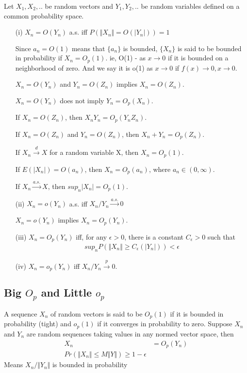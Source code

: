 \begin{definition}
Let $X_1, X_2,..$ be random vectors and $Y_1, Y_2,..$ be random variables defined on a common probability space.

\begin{itemize}
\item[(i)] $X_n = O(Y_n)$ a.s. iff $P(\Vert  X_n\Vert = O(|Y_n|)) = 1$

Since $a_n = O(1)$ means that $\{ a_n \}$ is bounded, $\{ X_n\}$ is said to be bounded in probability if $X_n = O_p(1)$. 
ie, O(1) - as $x \rightarrow 0$ if it is bounded on a neighborhood of zero. And we say it is o(1) as $x \rightarrow 0$ if $f(x) \rightarrow 0, x \rightarrow 0$.

$X_n = O(Y_n)$ and $Y_n = O(Z_n)$ implies $X_n = O(Z_n)$.

$X_n = O(Y_n)$ does not imply $Y_n = O_p(X_n)$.

If $X_n = O(Z_n)$, then $X_nY_n = O_p(Y_n Z_n)$.

If $X_n = O(Z_n)$ and $Y_n = O(Z_n)$, then $X_n + Y_n = O_p(Z_n)$.

If $X_n \xrightarrow {d} X$ for a random variable X, then $X_n = O_p(1)$.

If $E(|X_n|) = O(a_n)$, then $X_n = O_p(a_n)$, where $a_n \in (0, \infty)$.

If $X_n \xrightarrow {a.s.} X$, then $sup_n|X_n| = O_p(1)$.

\item[(ii)] $X_n = o(Y_n)$ a.s. iff $ X_n/Y_n \xrightarrow {a.s.} 0$

$X_n = o(Y_n)$ implies $X_n = O_p(Y_n)$.

\item[(iii)] $X_n = O_p(Y_n)$ iff, for any $\epsilon > 0$, there is a constant $C_{\epsilon} > 0$ such that 
 \begin{align*}
   sup_n P(\Vert  X_n\Vert \geq C_{\epsilon}(|Y_n|)) < \epsilon
\end{align*}

\item[(iv)] $X_n = o_p(Y_n)$ iff $X_n/Y_n \xrightarrow {p} 0$.


\end{itemize}
\end{definition}


\subsection{Big $O_p$ and Little $o_p$}
A sequence $X_n$ of random vectors is said to be $O_p(1)$ if it is bounded in probability (tight) and $o_p(1)$ if it converges in probability to zero.
Suppose $X_n$ and $Y_n$ are random sequences taking values in any normed vector space, then
\begin{align*}
	X_n &= O_p(Y_n) \\
	Pr(\Vert X_n \Vert \leq M \Vert Y \Vert) \geq 1 - \epsilon
\end{align*}
Means $X_n/ \Vert Y_n \Vert $ is bounded in probability 


